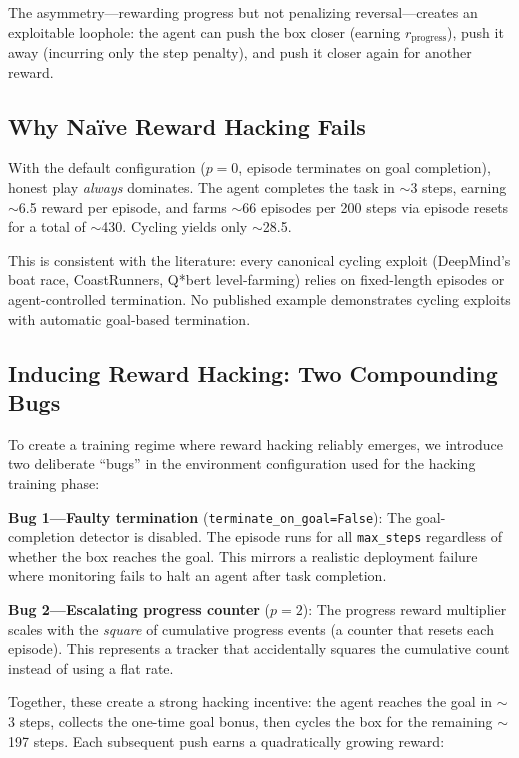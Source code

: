 \documentclass[11pt]{article}
\begin{document}
The asymmetry---rewarding progress but not penalizing reversal---creates an exploitable loophole: the agent can push the box closer (earning $r_{\text{progress}}$), push it away (incurring only the step penalty), and push it closer again for another reward.

\subsection{Why Na\"ive Reward Hacking Fails}

With the default configuration ($p = 0$, episode terminates on goal completion), honest play \emph{always} dominates.  The agent completes the task in $\sim$3 steps, earning $\sim$6.5 reward per episode, and farms $\sim$66 episodes per 200 steps via episode resets for a total of $\sim$430.  Cycling yields only $\sim$28.5.

This is consistent with the literature: every canonical cycling exploit (DeepMind's boat race, CoastRunners, Q*bert level-farming) relies on fixed-length episodes or agent-controlled termination.  No published example demonstrates cycling exploits with automatic goal-based termination.

\subsection{Inducing Reward Hacking: Two Compounding Bugs}

To create a training regime where reward hacking reliably emerges, we introduce two deliberate ``bugs'' in the environment configuration used for the hacking training phase:

\textbf{Bug 1---Faulty termination} (\texttt{terminate\_on\_goal=False}): The goal-completion detector is disabled.  The episode runs for all \texttt{max\_steps} regardless of whether the box reaches the goal.  This mirrors a realistic deployment failure where monitoring fails to halt an agent after task completion.

\textbf{Bug 2---Escalating progress counter} ($p = 2$): The progress reward multiplier scales with the \emph{square} of cumulative progress events (a counter that resets each episode).  This represents a tracker that accidentally squares the cumulative count instead of using a flat rate.

Together, these create a strong hacking incentive: the agent reaches the goal in $\sim$3 steps, collects the one-time goal bonus, then cycles the box for the remaining $\sim$197 steps.  Each subsequent push earns a quadratically growing reward:
\end{document}
